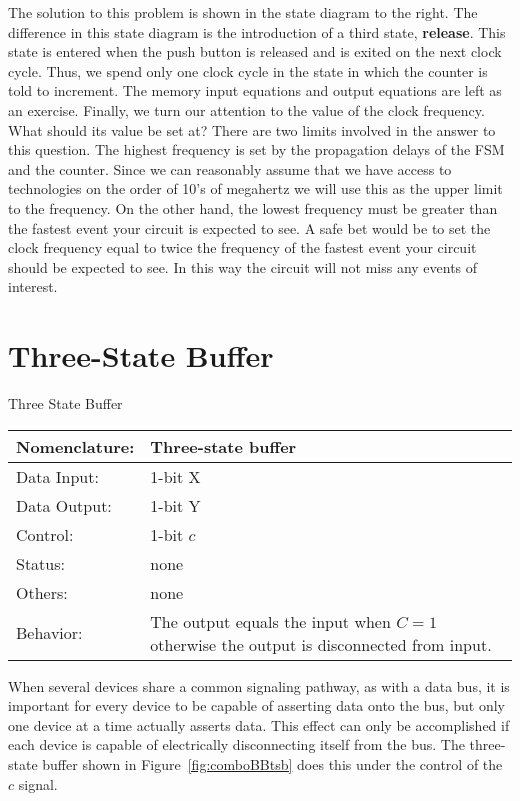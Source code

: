 The solution to this problem is shown in the state diagram to
the right.  The difference in this state diagram is the introduction
of a third state, \textbf{ release}.  This state is entered when the
push button is released and is exited on the next clock cycle.
Thus, we spend only one clock cycle in the state in which the
counter is told to increment.  The memory input equations and
output equations are left as an exercise.
Finally, we turn our attention to the value of the clock frequency.
What should its value be set at?  There are two limits involved
in the answer to this question.  The highest frequency is set by
the propagation delays of the FSM and the counter.  Since we
can reasonably assume that we have access to technologies on the
order of 10's of megahertz we will use this as the upper limit
to the frequency.  On the other hand, the lowest
frequency must be greater than the fastest event your circuit
is expected to see.  A safe bet would be to set the clock
frequency equal to twice the frequency of the fastest event your
circuit should be expected to see.   In this way the circuit
will not miss any events of interest.



\section{Three-State Buffer}
\begin{buildingblock}{Three State Buffer}
\label{buildingblock:threeStateBuffer}
\begin{tabular}{|l|p{3.5in}|} \hline
Nomenclature:  & Three-state buffer	\\ \hline
Data Input:    & 1-bit X		\\ \hline
Data Output:   & 1-bit Y		\\ \hline
Control:       & 1-bit $c$              \\ \hline
Status:        & none			\\ \hline
Others:        & none			\\ \hline
Behavior:      & The output equals the input when 
        $C=1$ otherwise the output is 
        disconnected from input. \\ \hline                                                                               
\end{tabular}
\label{page:tsb}
\end{buildingblock}

When several devices share a common signaling pathway, as with
a data bus, it is important for every device to be capable of 
asserting data onto the bus, but only one device at a time
actually asserts data.  This effect can only be accomplished if each
device is capable of electrically disconnecting itself from the
bus.  The three-state buffer shown in Figure~\ref{fig:comboBBtsb} does
this under the control of the $c$ signal.
                                                                                
